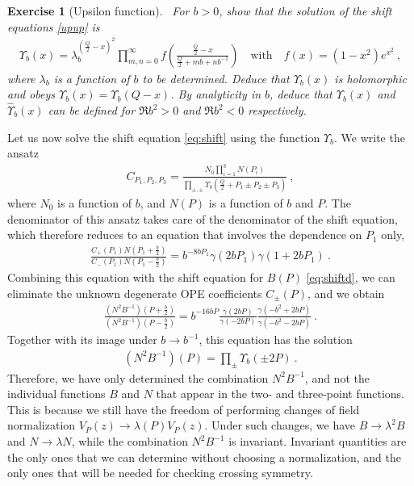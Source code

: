 \documentclass[12pt, a4paper]{article}
\theoremstyle{break}
\newtheorem{exo}{Exercise}[section]
\begin{document}
\begin{exo}[Upsilon function]
~\label{exo:upsilon}
 For $b>0$, show that the solution of the shift equations \eqref{upup} is 
 \begin{align}
 \Upsilon_b(x) = \lambda_b^{(\frac{Q}{2}-x)^2}\prod_{m,n=0}^\infty f\left(\frac{\frac{Q}{2}-x}{\frac{Q}{2}+mb+nb^{-1}}\right) \quad \text{with} \quad f(x)=(1-x^2)e^{x^2}\ ,
 \label{eq:up}
\end{align}
 where $\lambda_b$ is a function of $b$ to be determined. Deduce that $\Upsilon_b(x)$ is holomorphic and obeys $\Upsilon_b(x)=\Upsilon_b(Q-x)$. By analyticity in $b$, deduce that $\Upsilon_b(x)$ and $\hat\Upsilon_b(x)$ can be defined for $\Re b^2>0$ and $\Re b^2<0$ respectively.
\end{exo}
Let us now solve the shift equation \eqref{eq:shift} using the function $\Upsilon_b$. We write the ansatz
\begin{align}
 C_{P_1,P_2,P_3} =  \frac{N_0 \prod_{i=1}^3 N(P_i)}{\prod_{\pm,\pm} \Upsilon_b\left(\tfrac{Q}{2}+P_1\pm P_2 \pm P_3\right)} \ ,
 \label{cppp}
\end{align}
where $N_0$ is a function of $b$, and $N(P)$ is a function of $b$ and $P$. 
The denominator of this ansatz takes care of the denominator of the shift equation, which therefore reduces to an equation that involves the dependence on $P_1$ only, 
\begin{align}
 \frac{C_+(P_1) N(P_1+\frac{b}{2})}{C_-(P_1) N(P_1-\frac{b}{2}) } 
 =b^{-8bP_1}\gamma(2bP_1) \gamma(1+2bP_1) \ .
\end{align}
Combining this equation with the shift equation for $B(P)$ \eqref{eq:shiftd}, we can eliminate the unknown degenerate OPE coefficients $C_\pm(P)$, and we obtain
\begin{align}
 \frac{\left(N^2B^{-1}\right)(P+\frac{b}{2})}{\left(N^2B^{-1}\right)(P-\frac{b}{2})} = b^{-16bP} \frac{\gamma(2bP)}{\gamma(-2bP)} \frac{\gamma(-b^2+2bP)}{\gamma(-b^2-2bP)}\ .
 \label{nbs}
\end{align}
Together with its image under $b\to b^{-1}$, this equation has the solution
\begin{align}
 \left(N^2B^{-1}\right)(P) = \prod_\pm \Upsilon_b(\pm 2P)\ .
 \label{eq:ntbm}
\end{align}
Therefore, we have only determined the combination $N^2B^{-1}$, and not the individual functions $B$ and $N$ that appear in the two- and three-point functions. This is because we still have the freedom of performing changes of field normalization $V_P(z) \to \lambda(P)V_P(z)$. Under such changes, we have $B\to \lambda^2B$ and $N\to \lambda N$, while
the combination $N^2B^{-1}$ is invariant. Invariant quantities are the only ones that we can determine without choosing a normalization, and the only ones that will be needed for checking crossing symmetry. 
\end{document}
